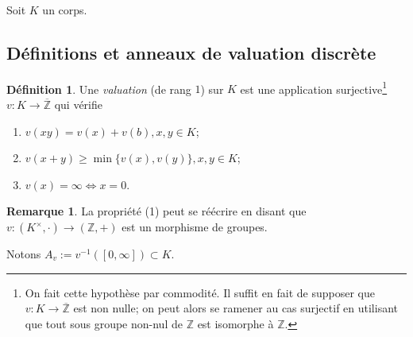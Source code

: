 \documentclass[a4paper, oneside, 12pt]{book}
\theoremstyle{theoremeStyle} %
\theoremstyle{definition} %
\newtheorem{definition}[theoreme]{Définition}
\newtheorem{remarque}[theoreme]{Remarque}
\newcommand{\Z}{\mathbb{Z}}
\begin{document}
   Soit $K$ un corps.


\subsection{Définitions et anneaux de valuation discrète}

\begin{definition}\label{ValDef}
  Une \textit{valuation} (de rang $1$) sur $K$ est une application surjective\footnote{On fait cette hypothèse par commodité. Il suffit en fait de supposer que $v:K\rightarrow \overline{\Z}$ est non nulle; on peut alors se ramener au cas surjectif en utilisant que  tout sous groupe non-nul de $\Z$ est isomorphe à $\Z$.}
  $v:K\rightarrow \overline{\Z}$  qui vérifie
  \begin{enumerate}
  \item $v(xy)=v (x)+v (b), x,y\in K$;
  \item $v(x+y)\geq \min\{v(x),v(y)\}, x,y\in K$;
  \item $v(x)=\infty \iff x=0$.
  \end{enumerate}
\end{definition}

\begin{remarque}
La propriété (1) peut se réécrire en disant que $v:(K^\times,\cdot)\rightarrow (\Z,+)$ est un morphisme de groupes.
\end{remarque}

Notons $A_v:=v^{-1}([0,\infty])\subset K$.
\end{document}
